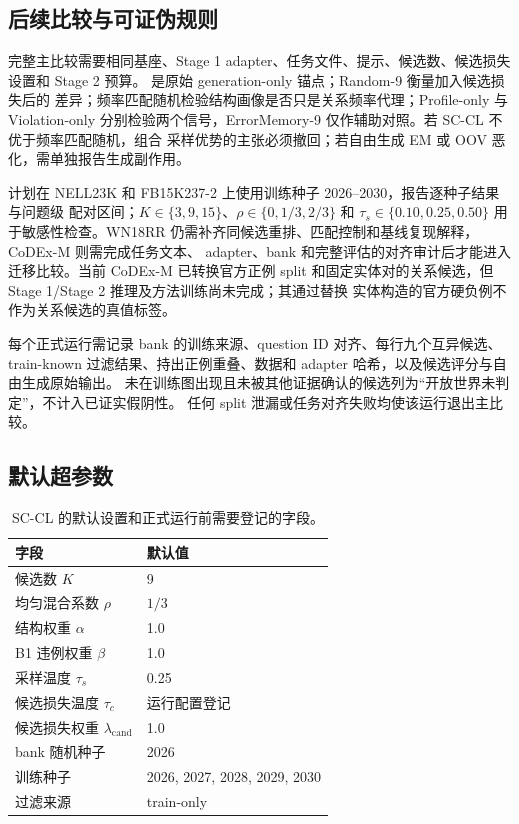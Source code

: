 \subsection{后续比较与可证伪规则}
\label{sec:future-protocol}

完整主比较需要相同基座、Stage 1 adapter、任务文件、提示、候选数、候选损失设置和
Stage 2 预算。\bone{} 是原始 generation-only 锚点；Random-9 衡量加入候选损失后的
差异；频率匹配随机检验结构画像是否只是关系频率代理；Profile-only 与 Violation-only
分别检验两个信号，ErrorMemory-9 仅作辅助对照。若 SC-CL 不优于频率匹配随机，组合
采样优势的主张必须撤回；若自由生成 EM 或 OOV 恶化，需单独报告生成副作用。

计划在 NELL23K 和 FB15K237-2 上使用训练种子 2026--2030，报告逐种子结果与问题级
配对区间；$K\in\{3,9,15\}$、$\rho\in\{0,1/3,2/3\}$ 和
$\tau_s\in\{0.10,0.25,0.50\}$ 用于敏感性检查。WN18RR 仍需补齐同候选重排、匹配控制和基线复现解释，CoDEx-M 则需完成任务文本、
adapter、bank 和完整评估的对齐审计后才能进入迁移比较。当前 CoDEx-M 已转换官方正例
split 和固定实体对的关系候选，但 Stage 1/Stage 2 推理及方法训练尚未完成；其通过替换
实体构造的官方硬负例不作为关系候选的真值标签。

每个正式运行需记录 bank 的训练来源、question ID 对齐、每行九个互异候选、train-known
过滤结果、持出正例重叠、数据和 adapter 哈希，以及候选评分与自由生成原始输出。
未在训练图出现且未被其他证据确认的候选列为“开放世界未判定”，不计入已证实假阴性。
任何 split 泄漏或任务对齐失败均使该运行退出主比较。

\subsection{默认超参数}

\begin{table}[h]
\caption{SC-CL 的默认设置和正式运行前需要登记的字段。}
\label{tab:hyper}
\centering\small
\begin{tabular}{ll}
\toprule
字段 & 默认值 \\
\midrule
候选数 $K$ & 9 \\
均匀混合系数 $\rho$ & $1/3$ \\
结构权重 $\alpha$ & 1.0 \\
B1 违例权重 $\beta$ & 1.0 \\
采样温度 $\tau_s$ & 0.25 \\
候选损失温度 $\tau_c$ & 运行配置登记 \\
候选损失权重 $\lambda_{\mathrm{cand}}$ & 1.0 \\
bank 随机种子 & 2026 \\
训练种子 & 2026, 2027, 2028, 2029, 2030 \\
过滤来源 & train-only \\
\bottomrule
\end{tabular}
\end{table}

